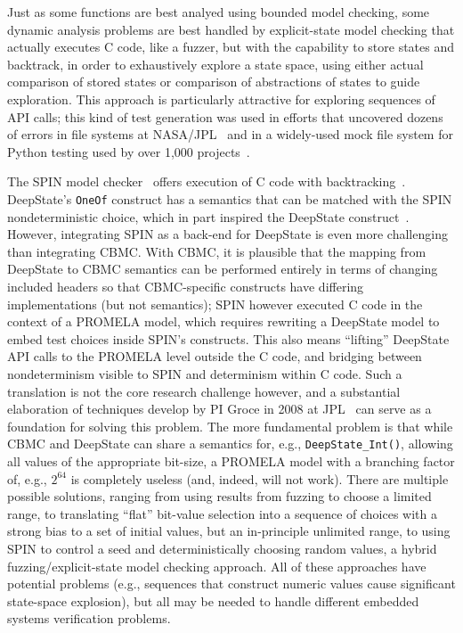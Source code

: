 Just as some functions are best analyed using bounded model checking, some dynamic analysis problems are best handled by explicit-state model checking that actually executes C code, like a fuzzer, but with the capability to store states and backtrack, in order to exhaustively explore a state space, using either actual comparison of stored states or comparison of abstractions of states to guide exploration.  This approach is particularly attractive for exploring sequences of API calls; this kind of test generation was used in efforts that uncovered dozens of errors in file systems at NASA/JPL~\cite{AMAI} and in a widely-used mock file system for Python testing used by over 1,000 projects~\cite{tstl}.

The SPIN model checker~\cite{SPIN} offers execution of C code with backtracking~\cite{ModelDriven,ModelCode}.  DeepState's {\tt OneOf} construct has a semantics that can be matched with the SPIN nondeterministic choice, which in part inspired the DeepState construct~\cite{WODA08,WODACommon}.  However, integrating SPIN as a back-end for DeepState is even more challenging than integrating CBMC.  With CBMC, it is plausible that the mapping from DeepState to CBMC semantics can be performed entirely in terms of changing included headers so that CBMC-specific constructs have differing implementations (but not semantics); SPIN however executed C code in the context of a PROMELA model, which requires rewriting a DeepState model to embed test choices inside SPIN's constructs.  This also means ``lifting'' DeepState API calls to the PROMELA level outside the C code, and bridging between nondeterminism visible to SPIN and determinism within C code.  Such a translation is not the core research challenge however, and a substantial elaboration of techniques develop by PI Groce in 2008 at JPL~\cite{WODA08} can serve as a foundation for solving this problem.  The more fundamental problem is that while CBMC and DeepState can share a semantics for, e.g., {\tt DeepState\_Int()}, allowing all values of the appropriate bit-size, a PROMELA model with a branching factor of, e.g., $2^{64}$ is completely useless (and, indeed, will not work).  There are multiple possible solutions, ranging from using results from fuzzing to choose a limited range, to translating ``flat'' bit-value selection into a sequence of choices with a strong bias to a set of initial values, but an in-principle unlimited range, to using SPIN to control a seed and deterministically choosing random values, a hybrid fuzzing/explicit-state model checking approach.  All of these approaches have potential problems (e.g., sequences that construct numeric values cause significant state-space explosion), but all may be needed to handle different embedded systems verification problems.
